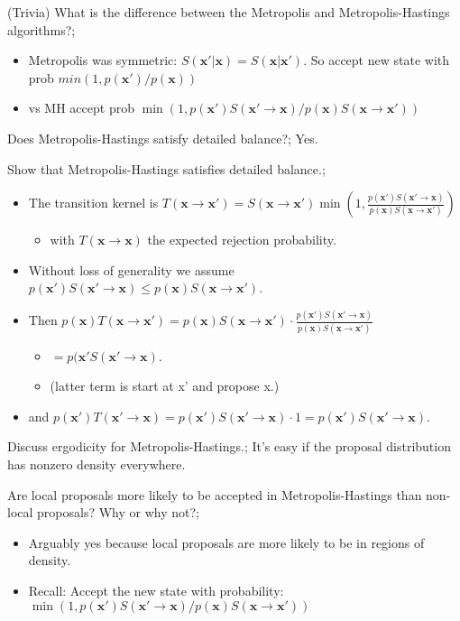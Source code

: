 \documentclass{article}
\begin{document}
(Trivia) What is the difference between the Metropolis and Metropolis-Hastings algorithms?; \begin{itemize}
    \item Metropolis was symmetric: $S(\mathbf{x'|x}) = S(\mathbf{x|x'})$. So accept new state with prob $min(1, p(\mathbf{x'})/p(\mathbf{x}))$ 
    \item vs MH accept prob $\min (1, p(\mathbf{x'})S(\mathbf{x'\rightarrow x})/p(\mathbf{x})S(\mathbf{x}\rightarrow \mathbf{x'}))$
\end{itemize}

Does Metropolis-Hastings satisfy detailed balance?; Yes.

Show that Metropolis-Hastings satisfies detailed balance.; \begin{itemize}
    \item The transition kernel is $T(\mathbf{x}\rightarrow \mathbf{x'}) = S(\mathbf{x}\rightarrow \mathbf{x'})\min(1, \frac{p(\mathbf{x'})S(\mathbf{x'\rightarrow x})}{p(\mathbf{x})S(\mathbf{x\rightarrow x'})})$ \begin{itemize}
        \item with $T(\mathbf{x\rightarrow x})$ the expected rejection probability.
    \end{itemize}
    \item Without loss of generality we assume $p(\mathbf{x'})S(\mathbf{x'}\rightarrow \mathbf{x}) \leq p(\mathbf{x})S(\mathbf{x}\rightarrow \mathbf{x'})$.
    \item Then $p(\mathbf{x})T(\mathbf{x}\rightarrow\mathbf{x'}) = p(\mathbf{x})S(\mathbf{x}\rightarrow\mathbf{x'})\cdot \frac{p(\mathbf{x'})S(\mathbf{x'}\rightarrow \mathbf{x})}{p(\mathbf{x})S(\mathbf{x}\rightarrow\mathbf{x'})}$\begin{itemize}
        \item $= p(\mathbf{x'}S(\mathbf{x'}\rightarrow \mathbf{x})$.
        \item (latter term is start at x' and propose x.)
    \end{itemize}
    \item and $p(\mathbf{x'})T(\mathbf{x'}\rightarrow \mathbf{x}) = p(\mathbf{x'})S(\mathbf{x'}\rightarrow \mathbf{x})\cdot 1 = p(\mathbf{x'})S(\mathbf{x'}\rightarrow \mathbf{x})$.
\end{itemize}

Discuss ergodicity for Metropolis-Hastings.; It's easy if the proposal distribution has nonzero density everywhere.

Are local proposals more likely to be accepted in Metropolis-Hastings than non-local proposals? Why or why not?; \begin{itemize}
    \item Arguably yes because local proposals are more likely to be in regions of density.
    \item Recall: Accept the new state with probability: $\min (1, p(\mathbf{x'})S(\mathbf{x'\rightarrow x})/p(\mathbf{x})S(\mathbf{x}\rightarrow \mathbf{x'}))$
\end{itemize} 
\end{document}
